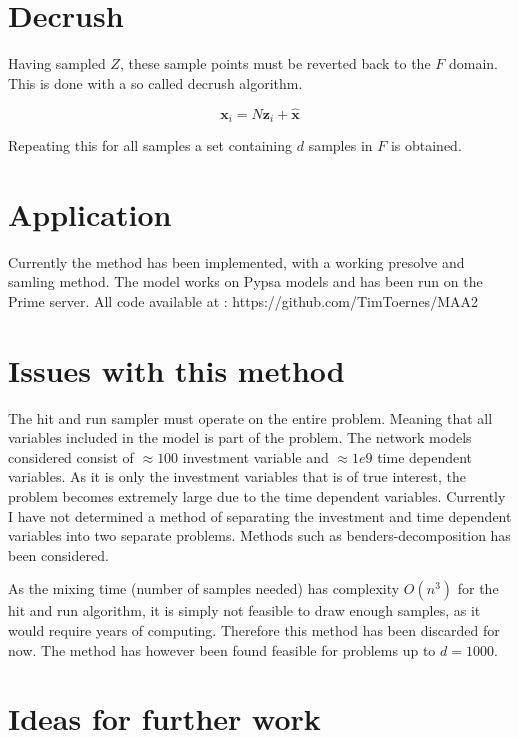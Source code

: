 \documentclass[11pt,a4paper,english]{article}
\begin{document}
\section{Decrush}

Having sampled $Z$, these sample points must be reverted back to the $F$ domain. This is done with a so called decrush algorithm. 

\begin{equation}
	\mathbf{x}_i = N \mathbf{z}_i + \mathbf{\hat{x}}
\end{equation}

Repeating this for all samples a set containing $d$ samples in $F$ is obtained. 


\section{Application}
	Currently the method has been implemented, with a working presolve and samling method. The model works on Pypsa models and has been run on the Prime server. All code available at :	https://github.com/TimToernes/MAA2 


\section{Issues with this method}

	The hit and run sampler must operate on the entire problem. Meaning that all variables included in the model is part of the problem. The network models considered consist of $\approx 100$ investment variable and $\approx 1e9$	time dependent variables. As it is only the investment variables that is of true interest, the problem becomes extremely large due to the time dependent variables. Currently I have not determined a method of separating the investment and time dependent variables into two separate problems. Methods such as benders-decomposition has been considered. 
	
	As the mixing time (number of samples needed) has complexity $O(n^3)$ for the hit and run algorithm, it is simply not feasible to draw enough samples, as it would require years of computing. Therefore this method has been discarded for now. The method has however been found feasible for problems up to $d=1000$. 

\section{Ideas for further work}
\end{document}
